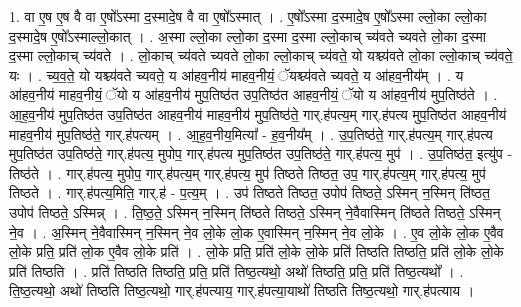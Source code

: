 \documentclass[17pt]{extarticle}
\begin{document}
1. वा ए॒ष ए॒ष वै वा ए॒षो᳚ऽस्मा द॒स्मादे॒ष वै वा ए॒षो᳚ऽस्मात् । . ए॒षो᳚ऽस्मा द॒स्मादे॒ष ए॒षो᳚ऽस्मा ल्लो॒का ल्लो॒का द॒स्मादे॒ष ए॒षो᳚ऽस्माल्लो॒कात् । . अ॒स्मा ल्लो॒का ल्लो॒का द॒स्मा द॒स्मा ल्लो॒काच् च्य॑वते च्यवते लो॒का द॒स्मा द॒स्मा ल्लो॒काच् च्य॑वते । . लो॒काच् च्य॑वते च्यवते लो॒का ल्लो॒काच् च्य॑वते॒ यो यश्च्य॑वते लो॒का ल्लो॒काच् च्य॑वते॒ यः । . च्य॒व॒ते॒ यो यश्च्य॑वते च्यवते॒ य आ॑हव॒नीय॑ माहव॒नीयं॒ ॅयश्च्य॑वते च्यवते॒ य आ॑हव॒नीय᳚म् । . य आ॑हव॒नीय॑ माहव॒नीयं॒ ॅयो य आ॑हव॒नीय॑ मुप॒तिष्ठ॑त उप॒तिष्ठ॑त आहव॒नीयं॒ ॅयो य आ॑हव॒नीय॑ मुप॒तिष्ठ॑ते । . आ॒ह॒व॒नीय॑ मुप॒तिष्ठ॑त उप॒तिष्ठ॑त आहव॒नीय॑ माहव॒नीय॑ मुप॒तिष्ठ॑ते॒ गार्.ह॑पत्य॒म् गार्.ह॑पत्य मुप॒तिष्ठ॑त आहव॒नीय॑ माहव॒नीय॑ मुप॒तिष्ठ॑ते॒ गार्.ह॑पत्यम् । . आ॒ह॒व॒नीय॒मित्या᳚ - ह॒व॒नीय᳚म् । . उ॒प॒तिष्ठ॑ते॒ गार्.ह॑पत्य॒म् गार्.ह॑पत्य मुप॒तिष्ठ॑त उप॒तिष्ठ॑ते॒ गार्.ह॑पत्य॒ मुपोप॒ गार्.ह॑पत्य मुप॒तिष्ठ॑त उप॒तिष्ठ॑ते॒ गार्.ह॑पत्य॒ मुप॑ । . उ॒प॒तिष्ठ॑त॒ इत्यु॑प - तिष्ठ॑ते । . गार्.ह॑पत्य॒ मुपोप॒ गार्.ह॑पत्य॒म् गार्.ह॑पत्य॒ मुप॑ तिष्ठते तिष्ठत॒ उप॒ गार्.ह॑पत्य॒म् गार्.ह॑पत्य॒ मुप॑ तिष्ठते । . गार्.ह॑पत्य॒मिति॒ गार्.ह॑ - प॒त्य॒म् । . उप॑ तिष्ठते तिष्ठत॒ उपोप॑ तिष्ठते॒ ऽस्मिन् न॒स्मिन् ति॑ष्ठत॒ उपोप॑ तिष्ठते॒ ऽस्मिन्न् । . ति॒ष्ठ॒ते॒ ऽस्मिन् न॒स्मिन् ति॑ष्ठते तिष्ठते॒ ऽस्मिन् ने॒वैवास्मिन् ति॑ष्ठते तिष्ठते॒ ऽस्मिन् ने॒व । . अ॒स्मिन् ने॒वैवास्मिन् न॒स्मिन् ने॒व लो॒के लो॒क ए॒वास्मिन् न॒स्मिन् ने॒व लो॒के । . ए॒व लो॒के लो॒क ए॒वैव लो॒के प्रति॒ प्रति॑ लो॒क ए॒वैव लो॒के प्रति॑ । . लो॒के प्रति॒ प्रति॑ लो॒के लो॒के प्रति॑ तिष्ठति तिष्ठति॒ प्रति॑ लो॒के लो॒के प्रति॑ तिष्ठति । . प्रति॑ तिष्ठति तिष्ठति॒ प्रति॒ प्रति॑ तिष्ठ॒त्यथो॒ अथो॑ तिष्ठति॒ प्रति॒ प्रति॑ तिष्ठ॒त्यथो᳚ । . ति॒ष्ठ॒त्यथो॒ अथो॑ तिष्ठति तिष्ठ॒त्यथो॒ गार्.ह॑पत्याय॒ गार्.ह॑पत्या॒याथो॑ तिष्ठति तिष्ठ॒त्यथो॒ गार्.ह॑पत्याय । \newline
\end{document}
